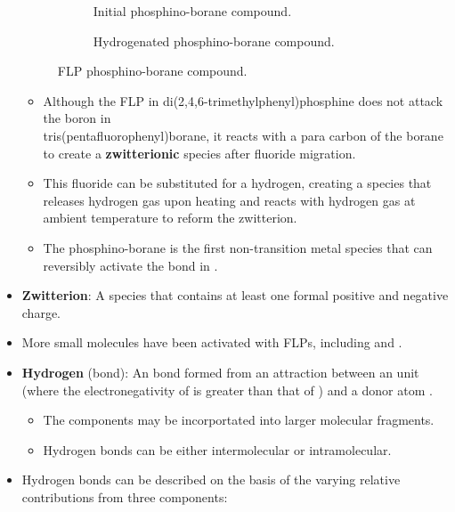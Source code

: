 \documentclass[../notes.tex]{subfiles}
\begin{document}
\begin{itemize}
\begin{figure}[h!]
\begin{subfigure}[b]{0.49\linewidth}
            \caption{Initial phosphino-borane compound.}
            \label{fig:FLPexamplec}
        \end{subfigure}
        \begin{subfigure}[b]{0.49\linewidth}
            \centering
            \caption{Hydrogenated phosphino-borane compound.}
            \label{fig:FLPexampled}
        \end{subfigure}
        \caption{FLP phosphino-borane compound.}
        \label{fig:FLPexample}
    \end{figure}
    \begin{itemize}
        \item Although the FLP in di(2,4,6-trimethylphenyl)phosphine does not attack the boron in\\tris(pentafluorophenyl)borane, it reacts with a para carbon of the borane to create a \textbf{zwitterionic} species after fluoride migration.
        \item This fluoride can be substituted for a hydrogen, creating a species that releases hydrogen gas upon heating and reacts with hydrogen gas at ambient temperature to reform the zwitterion.
        \item The phosphino-borane is the first non-transition metal species that can reversibly activate the  bond in .
    \end{itemize}
    \item \textbf{Zwitterion}: A species that contains at least one formal positive and negative charge.
    \item More small molecules have been activated with FLPs, including  and .
    \item \textbf{Hydrogen} (bond): An  bond formed from an attraction between an  unit (where the electronegativity of  is greater than that of ) and a donor atom .
    \begin{itemize}
        \item The components may be incorportated into larger molecular fragments.
        \item Hydrogen bonds can be either intermolecular or intramolecular.
    \end{itemize}
    \item Hydrogen bonds can be described on the basis of the varying relative contributions from three components:

\end{itemize}
\end{document}
